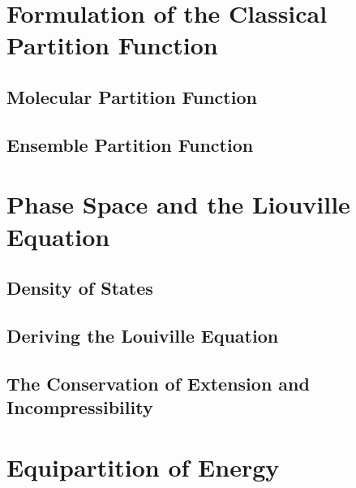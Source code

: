 \section{Formulation of the Classical Partition Function}%
\label{sec:cpf}

\subsection{Molecular Partition Function}

\subsection{Ensemble Partition Function}

\section{Phase Space and the Liouville Equation}%
\label{sec:psle}

\subsection{Density of States}

\subsection{Deriving the Louiville Equation}

\subsection{The Conservation of Extension and Incompressibility}

\section{Equipartition of Energy}%
\label{sec:eoe}
